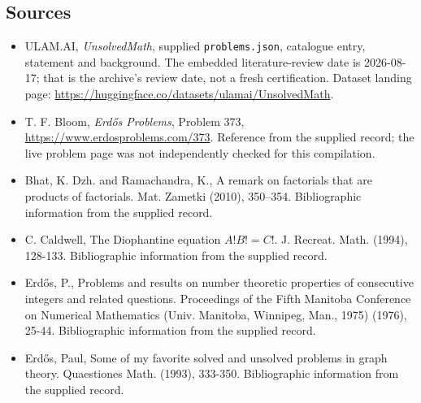 \documentclass[11pt,a4paper]{article}
\begin{document}
\subsection{Sources}

{\small

\begin{itemize}

\item[\hypertarget{source:statement:1}{S1}] ULAM.AI, \emph{UnsolvedMath}, supplied \texttt{problems.json}, catalogue entry, statement and background. The embedded literature-review date is 2026-08-17; that is the archive’s review date, not a fresh certification. Dataset landing page: \url{https://huggingface.co/datasets/ulamai/UnsolvedMath}.

\item[\hypertarget{source:statement:2}{S2}] T. F. Bloom, \emph{Erdős Problems}, Problem 373, \url{https://www.erdosproblems.com/373}. Reference from the supplied record; the live problem page was not independently checked for this compilation.

\item[\hypertarget{source:statement:3}{S3}] Bhat, K. Dzh. and Ramachandra, K., A remark on factorials that are products of factorials. Mat. Zametki (2010), 350--354. Bibliographic information from the supplied record.

\item[\hypertarget{source:statement:4}{S4}] C. Caldwell, The Diophantine equation $A!B!=C!$. J. Recreat. Math. (1994), 128-133. Bibliographic information from the supplied record.

\item[\hypertarget{source:statement:5}{S5}] Erd\H{o}s, P., Problems and results on number theoretic properties of consecutive integers and related questions. Proceedings of the Fifth Manitoba Conference on Numerical Mathematics (Univ. Manitoba, Winnipeg, Man., 1975) (1976), 25-44. Bibliographic information from the supplied record.

\item[\hypertarget{source:statement:6}{S6}] Erd\H{o}s, Paul, Some of my favorite solved and unsolved problems in graph theory. Quaestiones Math. (1993), 333-350. Bibliographic information from the supplied record.

\end{itemize}

}

\label{end:statement}
\end{document}
